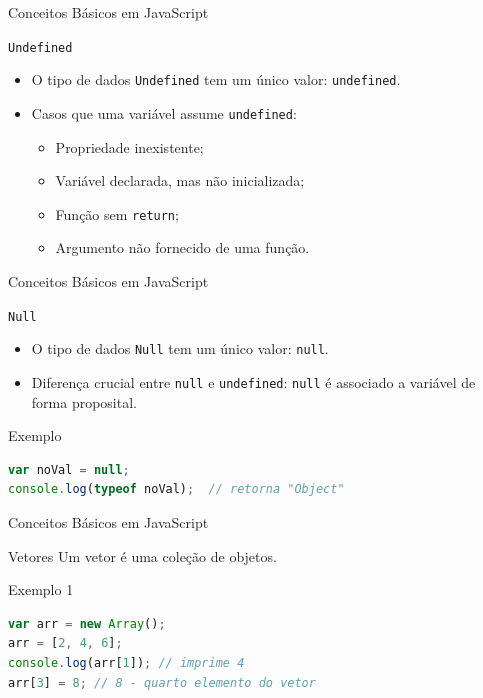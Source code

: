 \documentclass[xcolor=dvipsnames,table]{beamer}
\begin{document}
\begin{frame}[fragile]{Conceitos Básicos em JavaScript}
	\begin{block}{\tt Undefined}
		\begin{itemize}
			\item O tipo de dados {\tt Undefined} tem um único valor: {\tt undefined}. \pause
			\item Casos que uma variável assume {\tt undefined}: \pause
				\begin{itemize}
					\item Propriedade inexistente; \pause
					\item Variável declarada, mas não inicializada; \pause
					\item Função sem {\tt return}; \pause
					\item Argumento não fornecido de uma função.
				\end{itemize}
		\end{itemize}
	\end{block} 
\end{frame}

\begin{frame}[fragile]{Conceitos Básicos em JavaScript}
	\begin{block}{\tt Null}
		\begin{itemize}
			\item O tipo de dados {\tt Null} tem um único valor: {\tt null}. \pause
			\item Diferença crucial entre {\tt null} e {\tt undefined}: {\tt null} é associado a variável de forma proposital.
		\end{itemize}	
	\end{block} \pause
	\begin{block}{Exemplo}
		\begin{lstlisting}[language=JavaScript]
var noVal = null;
console.log(typeof noVal);	// retorna "Object"
\end{lstlisting}	
	\end{block}
\end{frame}

\begin{frame}[fragile]{Conceitos Básicos em JavaScript}
	\begin{block}{Vetores}
		Um vetor é uma coleção de objetos.	
	\end{block} \pause
	\begin{block}{Exemplo 1}
		\begin{lstlisting}[language=JavaScript]
var arr = new Array();
arr = [2, 4, 6];
console.log(arr[1]); // imprime 4
arr[3] = 8;	// 8 - quarto elemento do vetor
\end{lstlisting}	
	\end{block}
\end{frame}
\end{document}
